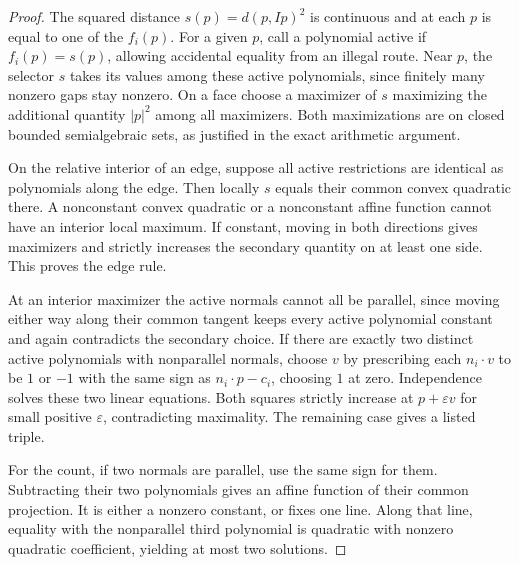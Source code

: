 \documentclass[10pt,letterpaper]{article}
\begin{document}
\begin{proof}
The squared distance $s(p)=d(p,Ip)^2$ is continuous and at each $p$
is equal to one of the $f_i(p)$. For a given $p$, call a polynomial
active if $f_i(p)=s(p)$, allowing accidental equality from an illegal
route. Near $p$, the selector $s$ takes its values among these active
polynomials, since finitely many nonzero gaps stay nonzero. On a face
choose a maximizer of $s$ maximizing the additional quantity $|p|^2$
among all maximizers. Both maximizations are on closed bounded
semialgebraic sets, as justified in the exact arithmetic argument.

On the relative interior of an edge, suppose all active restrictions
are identical as polynomials along the edge. Then locally $s$ equals
their common convex quadratic there. A nonconstant convex quadratic
or a nonconstant affine function cannot have an interior local maximum.
If constant, moving in both directions gives maximizers and strictly
increases the secondary quantity on at least one side. This proves the
edge rule.

At an interior maximizer the active normals cannot all be parallel, since moving either way along their common tangent keeps every active
polynomial constant and again contradicts the secondary choice.
If there are exactly two distinct active polynomials with nonparallel
normals, choose $v$ by prescribing each $n_i\cdot v$ to be $1$ or
$-1$ with the same sign as $n_i\cdot p-c_i$, choosing $1$ at zero.
Independence solves these two linear equations. Both squares strictly
increase at $p+\varepsilon v$ for small positive $\varepsilon$,
contradicting maximality. The remaining case gives a listed triple.

For the count, if two normals are parallel, use the same sign for them.
Subtracting their two polynomials gives an affine function of their
common projection. It is either a nonzero constant, or fixes one
line. Along that line, equality with the nonparallel third polynomial
is quadratic with nonzero quadratic coefficient, yielding at most
two solutions.


\end{proof}
\end{document}
